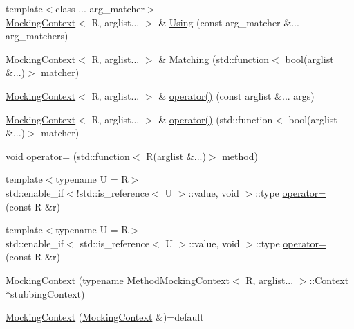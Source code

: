 \begin{DoxyCompactItemize}
\item 
{\footnotesize template$<$class ... arg\+\_\+matcher$>$ }\\\mbox{\hyperlink{classfakeit_1_1MockingContext}{Mocking\+Context}}$<$ R, arglist... $>$ \& \mbox{\hyperlink{classfakeit_1_1MockingContext_acb9bd9b011ac2ad88c8d08eebfa101ac}{Using}} (const arg\+\_\+matcher \&... arg\+\_\+matchers)
\item 
\mbox{\hyperlink{classfakeit_1_1MockingContext}{Mocking\+Context}}$<$ R, arglist... $>$ \& \mbox{\hyperlink{classfakeit_1_1MockingContext_a631dd9877017e082b2e1191b02f4c17a}{Matching}} (std\+::function$<$ bool(arglist \&...)$>$ matcher)
\item 
\mbox{\hyperlink{classfakeit_1_1MockingContext}{Mocking\+Context}}$<$ R, arglist... $>$ \& \mbox{\hyperlink{classfakeit_1_1MockingContext_a70a55886680449fa36e8f5869af93389}{operator()}} (const arglist \&... args)
\item 
\mbox{\hyperlink{classfakeit_1_1MockingContext}{Mocking\+Context}}$<$ R, arglist... $>$ \& \mbox{\hyperlink{classfakeit_1_1MockingContext_aff3a6b6107f5bc4e028e75bf9b55f313}{operator()}} (std\+::function$<$ bool(arglist \&...)$>$ matcher)
\item 
void \mbox{\hyperlink{classfakeit_1_1MockingContext_aadefb2bd6c1dee1f3aa8902277dd3fc2}{operator=}} (std\+::function$<$ R(arglist \&...)$>$ method)
\item 
{\footnotesize template$<$typename U  = R$>$ }\\std\+::enable\+\_\+if$<$!std\+::is\+\_\+reference$<$ U $>$\+::value, void $>$\+::type \mbox{\hyperlink{classfakeit_1_1MockingContext_adfac3df2408adaa86efec81bd5533a6d}{operator=}} (const R \&r)
\item 
{\footnotesize template$<$typename U  = R$>$ }\\std\+::enable\+\_\+if$<$ std\+::is\+\_\+reference$<$ U $>$\+::value, void $>$\+::type \mbox{\hyperlink{classfakeit_1_1MockingContext_ad5e903b223858dbe67f1da1523ef0d60}{operator=}} (const R \&r)
\item 
\mbox{\hyperlink{classfakeit_1_1MockingContext_a5700542bcb10d5ff297e389f9ea988e8}{Mocking\+Context}} (typename \mbox{\hyperlink{classfakeit_1_1MethodMockingContext}{Method\+Mocking\+Context}}$<$ R, arglist... $>$\+::Context $\ast$stubbing\+Context)
\item 
\mbox{\hyperlink{classfakeit_1_1MockingContext_aa4fec015b3088d8d98449f6a90525e0d}{Mocking\+Context}} (\mbox{\hyperlink{classfakeit_1_1MockingContext}{Mocking\+Context}} \&)=default
\item 

\end{DoxyCompactItemize}
